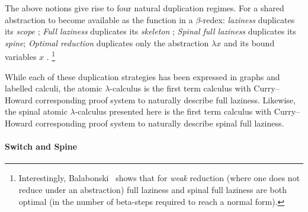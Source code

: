 \documentclass[a4paper,UKenglish,cleveref, autoref]{lipics-v2019}
\begin{document}
The above notions give rise to four natural duplication regimes. For a shared abstraction to become available as the function in a $\beta$-redex: \emph{laziness} duplicates its \emph{scope} \cite{Launchbury-1993}; \emph{Full laziness} duplicates its \emph{skeleton} \cite{Wadsworth-1971}; \emph{Spinal full laziness} duplicates its \emph{spine}; \emph{Optimal reduction} duplicates only the abstraction $\lambda x$ and its bound variables $x$ \cite{Lamping-1990,Asperti-Guerrini-1998}.%
\footnote{Interestingly, Balabonski~\cite{Balabonski-2012} shows that for \emph{weak} reduction (where one does not reduce under an abstraction) full laziness and spinal full laziness are both optimal (in the number of beta-steps required to reach a normal form).}

While each of these duplication strategies has been expressed in graphs and labelled calculi, the atomic $\lambda$-calculus is the first term calculus with Curry--Howard corresponding proof system to naturally describe full laziness. Likewise, the spinal atomic $\lambda$-calculus presented here is the first term calculus with Curry--Howard corresponding proof system to naturally describe spinal full laziness.


\paragraph*{Switch and Spine}
\end{document}
